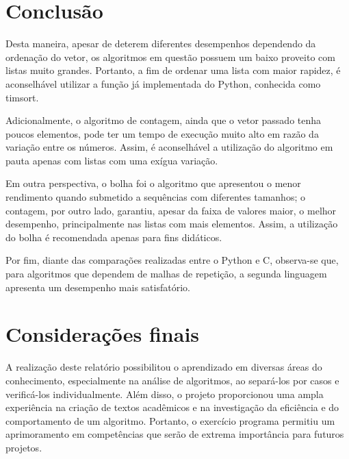 \section{Conclusão}
Desta maneira, apesar de deterem diferentes desempenhos dependendo da ordenação do vetor, os algoritmos em questão possuem um baixo proveito com listas muito grandes. Portanto, a fim de ordenar uma lista com maior rapidez, é aconselhável utilizar a função já implementada do Python, conhecida como timsort.

Adicionalmente, o algoritmo de contagem, ainda que o vetor passado tenha poucos elementos, pode ter um tempo de execução muito alto em razão da variação entre os números. Assim, é aconselhável a utilização do algoritmo em pauta apenas com listas com uma exígua variação.

Em outra perspectiva, o bolha foi o algoritmo que apresentou o menor rendimento quando submetido a sequências com diferentes tamanhos; o contagem, por outro lado, garantiu, apesar da faixa de valores maior, o melhor desempenho, principalmente nas listas com mais elementos. Assim, a utilização do bolha é recomendada apenas para fins didáticos.


Por fim, diante das comparações realizadas entre o Python e C, observa-se que, para algoritmos que dependem de malhas de repetição, a segunda linguagem apresenta um desempenho mais satisfatório.

\section{Considerações finais}
A realização deste relatório possibilitou o aprendizado em diversas áreas do conhecimento, especialmente na análise de algoritmos, ao separá-los por casos e verificá-los individualmente.
Além disso, o projeto proporcionou uma ampla experiência na criação de textos acadêmicos e na investigação da eficiência e do comportamento de um algoritmo.
Portanto, o exercício programa permitiu um aprimoramento em competências que serão de extrema importância para futuros projetos.
